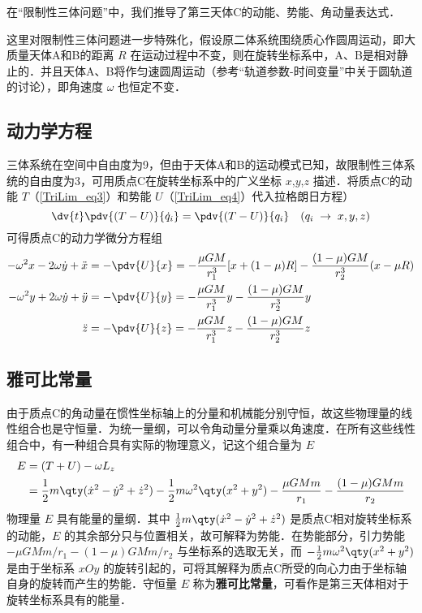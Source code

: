 

在“限制性三体问题”中，我们推导了第三天体C的动能、势能、角动量表达式．

这里对限制性三体问题进一步特殊化，假设原二体系统围绕质心作圆周运动，即大质量天体A和B的距离 $R$ 在运动过程中不变，则在旋转坐标系中，A、B是相对静止的．并且天体A、B将作匀速圆周运动（参考“轨道参数-时间变量”中关于圆轨道的讨论），即角速度 $\omega$ 也恒定不变．


\subsection{动力学方程}
三体系统在空间中自由度为9，但由于天体A和B的运动模式已知，故限制性三体系统的自由度为3，可用质点C在旋转坐标系中的广义坐标 $x$,$y$,$z$ 描述．将质点C的动能 $T$（\autoref{TriLim_eq3}）和势能 $U$（\autoref{TriLim_eq4}）代入拉格朗日方程）
\begin{equation}%
\dv{t} \pdv{(T-U)}{\dot q_i} = \pdv{(T-U)}{q_i}
\quad (q_i\; \rightarrow \; x,y,z)
\end{equation}
可得质点C的动力学微分方程组
\begin{align}
-\omega^2 x - 2\omega\dot{y} + \ddot{x} &=- \pdv{U}{x}=-\frac{\mu GM}{r_1^3}[x+(1-\mu)R]-\frac{(1-\mu)GM}{r_2^3}(x-\mu R)\label{JConst_eq2}\\%
-\omega^2 y +2\omega\dot{y} + \ddot{y} &=- \pdv{U}{y}=-\frac{\mu GM}{r_1^3}y-\frac{(1-\mu)GM}{r_2^3}y\label{JConst_eq3}\\%
\ddot{z} &=- \pdv{U}{z} =-\frac{\mu GM}{r_1^3}z-\frac{(1-\mu)GM}{r_2^3}z\label{JConst_eq4}%
\end{align}

\subsection{雅可比常量}
由于质点C的角动量在惯性坐标轴上的分量和机械能分别守恒，故这些物理量的线性组合也是守恒量．为统一量纲，可以令角动量分量乘以角速度．在所有这些线性组合中，有一种组合具有实际的物理意义，记这个组合量为 $E$ 
\begin{equation}%
\begin{aligned}
E &=(T+U)-\omega L_z\\
&=\frac{1}{2}m\qty(\dot{x}^2-\dot{y}^2+\dot{z}^2)-\frac{1}{2}m\omega^2\qty(x^2+y^2)-\frac{\mu GMm}{r_1}-\frac{(1-\mu)GMm}{r_2}
\end{aligned}
\end{equation}
物理量 $E$ 具有能量的量纲．其中 $\frac{1}{2}m\qty(\dot{x}^2-\dot{y}^2+\dot{z}^2)$ 是质点C相对旋转坐标系的动能，$E$ 的其余部分只与位置相关，故可解释为势能．在势能部分，引力势能 $-\mu GMm/r_1-(1-\mu)GMm/r_2$ 与坐标系的选取无关，而 $-\frac{1}{2}m\omega^2\qty(x^2+y^2)$ 是由于坐标系 $xOy$ 的旋转引起的，可将其解释为质点C所受的向心力由于坐标轴自身的旋转而产生的势能．守恒量 $E$ 称为\textbf{雅可比常量}，可看作是第三天体相对于旋转坐标系具有的能量．

